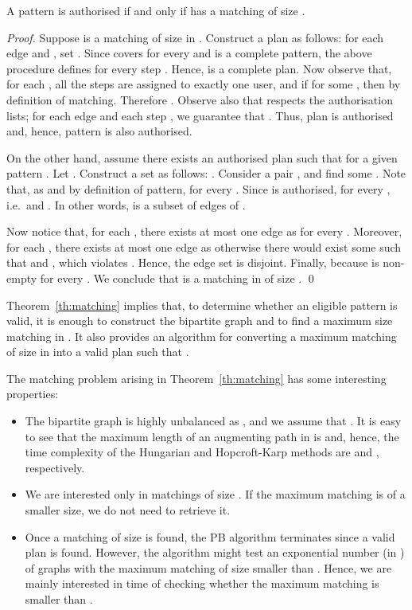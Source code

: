 \documentclass[runningheads,proof]{llncs}
\begin{document}
\begin{theorem}
\label{th:matching}
 A pattern  is authorised if and only if  has a matching of size .
\end{theorem}
\begin{proof}
Suppose  is a matching of size  in . 
Construct a plan  as follows: for each edge  and , set .  
Since  covers  for every  and  is a complete pattern, the above procedure defines  for every step .
Hence,  is a complete plan.
Now observe that, for each , all the steps  are assigned to exactly one user, and if  for some , then  by definition of matching.
Therefore . 
Observe also that  respects the authorisation lists; for each edge  and each step , we guarantee that . 
Thus, plan  is authorised and, hence, pattern  is also authorised.

\smallskip
On the other hand, assume there exists an authorised plan  such that  for a given pattern \@.  
Let .  
Construct a set  as follows: .  
Consider a pair , and find some .
Note that, as  and by definition of pattern,  for every .  
Since  is authorised,  for every , i.e.\  and .  In other words,  is a subset of edges of .

Now notice that, for each , there exists at most one edge  as  for every .  Moreover, for each , there exists at most one edge  as otherwise there would exist some  such that  and , which violates .  Hence, the edge set  is disjoint.  Finally,  because  is non-empty for every .  We conclude that  is a matching in  of size .
\qed
\end{proof}

Theorem~\ref{th:matching} implies that, to determine whether an eligible pattern  is valid, it is enough to construct the bipartite graph  and to find a maximum size matching in .  
It also provides an algorithm for converting a maximum matching  of size  in  into a valid plan  such that .

The matching problem arising in Theorem~\ref{th:matching} has some interesting properties:
\begin{itemize}
	\item The bipartite graph  is highly unbalanced as , and we assume that .  
	It is easy to see that the maximum length of an augmenting path in  is  and, hence, the time complexity of the Hungarian and Hopcroft-Karp methods are  and , respectively.
	\item We are interested only in matchings of size .  If the maximum matching is of a smaller size, we do not need to retrieve it.
	\item Once a matching of size  is found, the PB algorithm terminates since a valid plan is found.  
	However, the algorithm might test an exponential number (in ) of graphs with the maximum matching of size smaller than .
	Hence, we are mainly interested in time of checking whether the maximum matching is smaller than .
\end{itemize}
\end{document}
